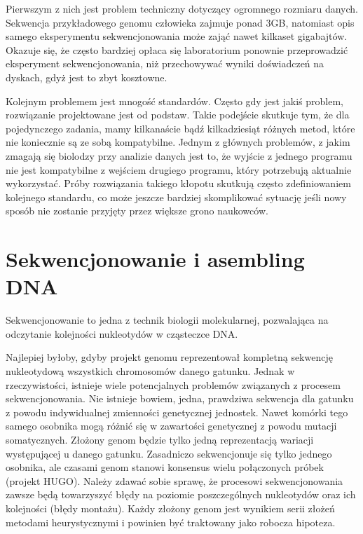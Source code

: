 Pierwszym z nich jest problem techniczny dotyczący ogromnego rozmiaru danych.
Sekwencja przykładowego genomu człowieka zajmuje ponad 3GB, natomiast opis samego eksperymentu sekwencjonowania może zająć nawet kilkaset gigabajtów. 
Okazuje się, że często bardziej opłaca się laboratorium ponownie przeprowadzić eksperyment sekwencjonowania, niż przechowywać wyniki doświadczeń na dyskach, gdyż jest to zbyt kosztowne.

Kolejnym problemem jest mnogość standardów. 
Często gdy jest jakiś problem, rozwiązanie projektowane jest od podstaw. 
Takie podejście skutkuje tym, że dla pojedynczego zadania, mamy kilkanaście bądź kilkadziesiąt różnych metod, które nie koniecznie są ze sobą kompatybilne. 
Jednym z głównych problemów, z jakim zmagają się biolodzy przy analizie danych jest to, że wyjście z jednego programu nie jest kompatybilne z wejściem drugiego programu, który potrzebują aktualnie wykorzystać. 
Próby rozwiązania takiego kłopotu skutkują często zdefiniowaniem kolejnego standardu, co może jeszcze bardziej skomplikować sytuację jeśli nowy sposób nie zostanie przyjęty przez większe grono naukowców.


\section{Sekwencjonowanie i asembling DNA}
Sekwencjonowanie to jedna z technik biologii molekularnej, pozwalająca na odczytanie kolejności nukleotydów w cząsteczce DNA.

Najlepiej byłoby, gdyby projekt genomu reprezentował kompletną sekwencję nukleotydową wszystkich chromosomów danego gatunku. 
Jednak w rzeczywistości, istnieje wiele potencjalnych problemów związanych z procesem sekwencjonowania. Nie istnieje bowiem, jedna, prawdziwa sekwencja dla gatunku z powodu indywidualnej zmienności genetycznej jednostek. 
Nawet komórki tego samego osobnika mogą różnić się w zawartości genetycznej z powodu mutacji somatycznych. Złożony genom będzie tylko jedną reprezentacją wariacji występującej u danego gatunku. 
Zasadniczo sekwencjonuje się tylko jednego osobnika, ale czasami genom stanowi konsensus wielu połączonych próbek (projekt HUGO). 
Należy zdawać sobie sprawę, że procesowi sekwencjonowania zawsze będą towarzyszyć błędy na poziomie poszczególnych nukleotydów oraz ich kolejności (błędy montażu). 
Każdy złożony genom jest wynikiem serii złożeń metodami heurystycznymi i powinien być traktowany jako robocza hipoteza.

